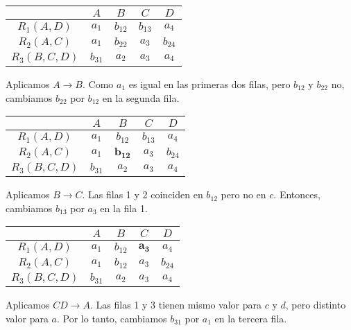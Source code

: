 \documentclass[a4paper, twoside]{article}
\begin{document}
\begin{center}
	\begin{tabular}{|c|c|c|c|c|}
		\hline 
		 & $A$ & $B$ & $C$ & $D$\\
		\hline 
		\hline 
		$R_{1}(A,D)$ & \textbf{$a_{1}$} & \textbf{$b_{12}$} & $b_{13}$ & $a_{4}$\\
		\hline 
		$R_{2}(A,C)$ & $a_{1}$ & $b_{22}$ & $a_{3}$ & $b_{24}$\\
		\hline 
		$R_{3}(B,C,D)$ & $b_{31}$ & $a_{2}$ & $a_{3}$ & \textbf{$a_{4}$}\\
		\hline 
	\end{tabular}
\end{center}

Aplicamos $A\to B$. Como $a_{1}$ es igual en las primeras dos filas, pero $b_{12}$ y $b_{22}$ no, cambiamos $b_{22}$ por $b_{12}$ en la segunda fila.

\begin{center}
	\begin{tabular}{|c|c|c|c|c|}
		\hline 
		 & $A$ & $B$ & $C$ & $D$\\
		\hline 
		\hline 
		$R_{1}(A,D)$ & $a_{1}$ & $b_{12}$ & $b_{13}$ & $a_{4}$\\
		\hline 
		$R_{2}(A,C)$ & $a_{1}$ & $\mathbf{b_{12}}$ & $a_{3}$ & $b_{24}$\\
		\hline 
		$R_{3}(B,C,D)$ & $b_{31}$ & $a_{2}$ & $a_{3}$ & \textbf{$a_{4}$}\\
		\hline 
	\end{tabular}
\end{center}

Aplicamos $B\to C.$ Las filas 1 y 2 coinciden en $b_{12}$ pero no en $c$. Entonces, cambiamos $b_{13}$ por $a_{3}$ en la fila 1.

\begin{center}
	\begin{tabular}{|c|c|c|c|c|}
		\hline 
		 & $A$ & $B$ & $C$ & $D$\\
		\hline 
		\hline 
		$R_{1}(A,D)$ & $a_{1}$ & $b_{12}$ & $\mathbf{a_{3}}$ & $a_{4}$\\
		\hline 
		$R_{2}(A,C)$ & $a_{1}$ & $b_{12}$ & $a_{3}$ & $b_{24}$\\
		\hline 
		$R_{3}(B,C,D)$ & $b_{31}$ & $a_{2}$ & $a_{3}$ & \textbf{$a_{4}$}\\
		\hline 
	\end{tabular}
\end{center}

Aplicamos $CD\to A$. Las filas 1 y 3 tienen mismo valor para $c$ y $d$, pero distinto valor para $a$. Por lo tanto, cambiamos $b_{31}$ por $a_{1}$ en la tercera fila.
\end{document}
